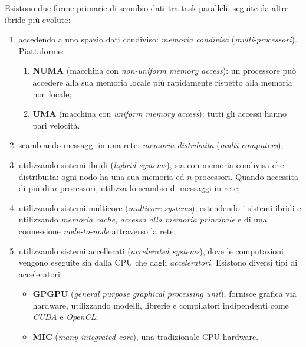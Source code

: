 Esistono due forme primarie di scambio dati tra task paralleli, seguite da altre ibride più evolute:
\begin{enumerate}
	\item accedendo a uno spazio dati condiviso: \textit{memoria condivisa} (\textit{multi-processori}). Piattaforme:
	\begin{enumerate}
		\item \textbf{NUMA} (macchina con \textit{non-uniform memory access}): un processore può accedere alla sua memoria locale più rapidamente rispetto alla memoria non locale;
		\item \textbf{UMA} (macchina con \textit{uniform memory access}): tutti gli accessi hanno pari velocità.
	\end{enumerate}
	\item scambiando messaggi in una rete: \textit{memoria distribuita} (\textit{multi-computers});
	\item utilizzando sistemi ibridi (\textit{hybrid systems}), sia con memoria condivisa che distribuita: ogni nodo ha una sua memoria ed $n$ processori. Quando necessita di più di $n$ processori, utilizza lo scambio di messaggi in rete;
	\item utilizzando sistemi multicore (\textit{multicore systems}), estendendo i sistemi ibridi e utilizzando \textit{memoria cache}, \textit{accesso alla memoria principale} e di una connessione \textit{node-to-node} attraverso la rete;
	\item utilizzando sistemi accellerati (\textit{accelerated systems}), dove le computazioni vengono eseguite sia dalla CPU che dagli \textit{acceleratori}. Esistono diversi tipi di acceleratori:
	\begin{itemize}
		\item \textbf{GPGPU} (\textit{general purpose graphical processing unit}), fornisce grafica via hardware, utilizzando modelli, librerie e compilatori indipendenti come \textit{CUDA} e \textit{OpenCL};
		\item \textbf{MIC} (\textit{many integrated core}), una tradizionale CPU hardware.
	\end{itemize}
\end{enumerate}

